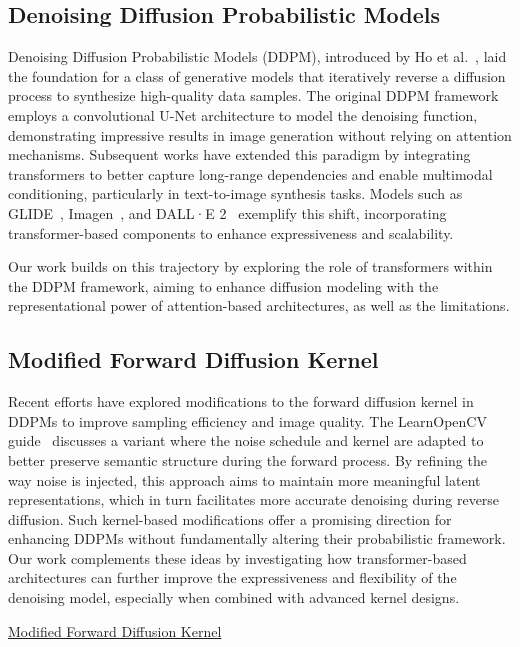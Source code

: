 \documentclass[twocolumn,superscriptaddress,aps]{revtex4-1}
\begin{document}
\subsection{Denoising Diffusion Probabilistic Models}

Denoising Diffusion Probabilistic Models (DDPM), introduced by Ho et al.~\cite{ho2020ddpm}, laid the foundation for a class of generative models that iteratively reverse a diffusion process to synthesize high-quality data samples. The original DDPM framework employs a convolutional U-Net architecture to model the denoising function, demonstrating impressive results in image generation without relying on attention mechanisms. Subsequent works have extended this paradigm by integrating transformers to better capture long-range dependencies and enable multimodal conditioning, particularly in text-to-image synthesis tasks. Models such as GLIDE~\cite{nichol2021glide}, Imagen~\cite{saharia2022imagen}, and DALL·E 2~\cite{ramesh2022hierarchical} exemplify this shift, incorporating transformer-based components to enhance expressiveness and scalability.

Our work builds on this trajectory by exploring the role of transformers within the DDPM framework, aiming to enhance diffusion modeling with the representational power of attention-based architectures, as well as the limitations.

\subsection{Modified Forward Diffusion Kernel}
Recent efforts have explored modifications to the forward diffusion kernel in DDPMs to improve sampling efficiency and image quality. The LearnOpenCV guide~\cite{learnopencv2023ddpm} discusses a variant where the noise schedule and kernel are adapted to better preserve semantic structure during the forward process. By refining the way noise is injected, this approach aims to maintain more meaningful latent representations, which in turn facilitates more accurate denoising during reverse diffusion. Such kernel-based modifications offer a promising direction for enhancing DDPMs without fundamentally altering their probabilistic framework. Our work complements these ideas by investigating how transformer-based architectures can further improve the expressiveness and flexibility of the denoising model, especially when combined with advanced kernel designs.

\href{https://learnopencv.com/denoising-diffusion-probabilistic-models/#modified-forward-diffusion-kernel}{Modified Forward Diffusion Kernel}
\end{document}
